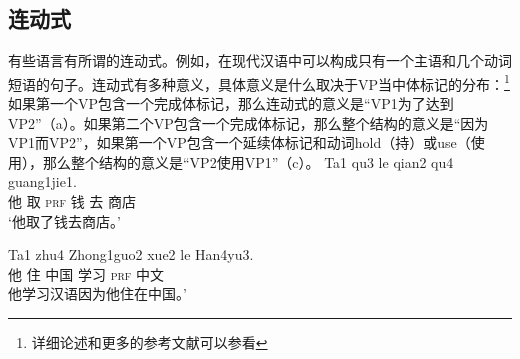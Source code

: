 \begin{exe}
\begin{xlist}[iv.]
\begin{exe}
\begin{xlist}[iv.]
\subsection{连动式}
有些语言有所谓的连动式。例如，在现代汉语中可以构成只有一个主语和几个动词短语的句子\citep[\S~21]{LT81a}。连动式有多种意义，具体意义是什么取决于VP当中体标记的分布：\footnote{
  详细论述和更多的参考文献可以参看
} 
如果第一个VP包含一个完成体标记，那么连动式的意义是“VP1为了达到VP2”（a）。如果第二个VP包含一个完成体标记，那么整个结构的意义是“因为VP1而VP2”，如果第一个VP包含一个延续体标记和动词hold（持）或use（使用），那么整个结构的意义是“VP2使用VP1”（c）。
\eal
\ex
\gll Ta1 qu3 le qian2 qu4 guang1jie1. \\
     他 取 \textsc{prf} 钱 去 商店 \\
\glt `他取了钱去商店。'

\ex
\gll Ta1 zhu4 Zhong1guo2 xue2 le Han4yu3. \\
     他  住 中国 学习 \textsc{prf} 中文 \\
\glt 他学习汉语因为他住在中国。'


\end{xlist}
\end{exe}
\end{xlist}
\end{exe}
